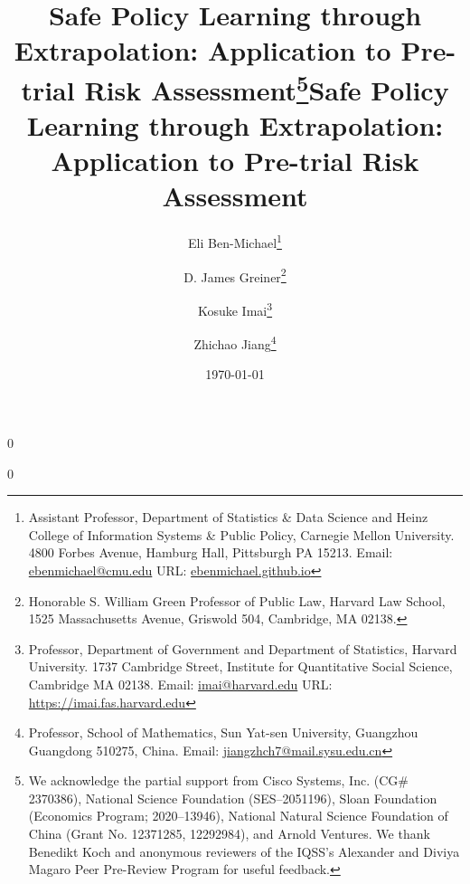 \documentclass[12pt]{article}
\theoremstyle{definition}
\newcommand{\<}{\langle}
\renewcommand{\>}{\rangle}
\begin{document}
\newcommand{\blind}{0}

\newcommand{\tit}{\LARGE \bf Safe Policy Learning through Extrapolation: Application to
Pre-trial Risk Assessment}


\blind


\title{\tit\thanks{We acknowledge the partial support from Cisco
    Systems, Inc. (CG\# 2370386), National Science Foundation
    (SES--2051196), Sloan Foundation (Economics Program; 2020--13946),
    National Natural Science Foundation of China (Grant No. 12371285, 12292984),
    and Arnold Ventures.  We thank Benedikt Koch and anonymous
    reviewers of the IQSS's Alexander and Diviya Magaro Peer
    Pre-Review Program for useful feedback.}}

\date{\today}

\author{Eli Ben-Michael\thanks{Assistant Professor, Department of
    Statistics \& Data Science and Heinz College of Information
    Systems \& Public Policy, Carnegie Mellon University. 4800 Forbes
    Avenue, Hamburg Hall, Pittsburgh PA 15213.  Email:
    \href{mailto:ebenmichael@cmu.edu}{ebenmichael@cmu.edu} URL:
    \href{https://ebenmichael.github.io}{ebenmichael.github.io}} \and
  \and D. James Greiner\thanks{Honorable S.  William Green Professor
    of Public Law, Harvard Law School, 1525 Massachusetts Avenue,
    Griswold 504, Cambridge, MA 02138.}  \and Kosuke
  Imai\thanks{Professor, Department of Government and Department of
    Statistics, Harvard University.  1737 Cambridge Street, Institute
    for Quantitative Social Science, Cambridge MA 02138.  Email:
    \href{mailto:imai@harvard.edu}{imai@harvard.edu} URL:
    \href{https://imai.fas.harvard.edu}{https://imai.fas.harvard.edu}}
  \and Zhichao Jiang\thanks{Professor, School of Mathematics, Sun
    Yat-sen University, Guangzhou Guangdong 510275, China. Email:
    \href{mailto:jiangzhch7@mail.sysu.edu.cn}{jiangzhch7@mail.sysu.edu.cn}
  }}
\maketitle
  
\fi


\blind
\title{\bf \tit}
\maketitle
\fi


\renewcommand\thmcontinues[1]{Continued}

\thispagestyle{empty}
\end{document}
